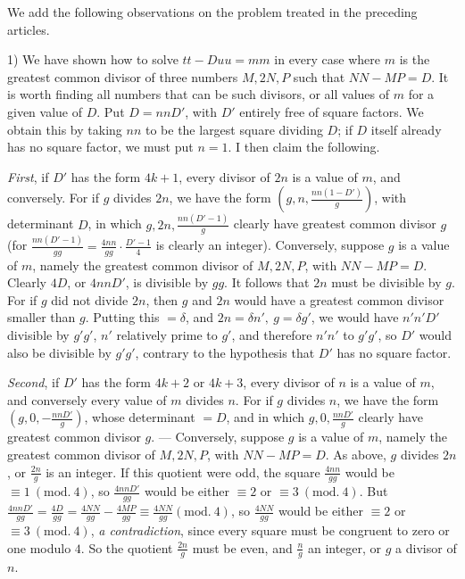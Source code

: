 We add the following observations on the problem treated in the preceding articles.

1) We have shown how to solve \(tt-Duu=mm\) in every case where \(m\) is the greatest common divisor of three numbers \(M,2N,P\) such that \(NN-MP=D\). It is worth finding all numbers that can be such divisors, or all values of \(m\) for a given value of \(D\). Put \(D=nnD'\), with \(D'\) entirely free of square factors. We obtain this by taking \(nn\) to be the largest square dividing \(D\); if \(D\) itself already has no square factor, we must put \(n=1\). I then claim the following.

\textit{First}, if \(D'\) has the form \(4k+1\), every divisor of \(2n\) is a value of \(m\), and conversely. For if \(g\) divides \(2n\), we have the form \(\left(g,n,\frac{nn(1-D')}{g}\right)\), with determinant \(D\), in which \(g,2n,\frac{nn(D'-1)}{g}\) clearly have greatest common divisor \(g\) (for \(\frac{nn(D'-1)}{gg}=\frac{4nn}{gg}\cdot\frac{D'-1}{4}\) is clearly an integer). Conversely, suppose \(g\) is a value of \(m\), namely the greatest common divisor of \(M,2N,P\), with \(NN-MP=D\). Clearly \(4D\), or \(4nnD'\), is divisible by \(gg\). It follows that \(2n\) must be divisible by \(g\). For if \(g\) did not divide \(2n\), then \(g\) and \(2n\) would have a greatest common divisor smaller than \(g\). Putting this \(=\delta\), and
\(2n=\delta n',\ g=\delta g'\), we would have \(n'n'D'\) divisible by \(g'g'\), \(n'\) relatively prime to \(g'\), and therefore \(n'n'\) to \(g'g'\), so \(D'\) would also be divisible by \(g'g'\), contrary to the hypothesis that \(D'\) has no square factor.

\textit{Second}, if \(D'\) has the form \(4k+2\) or \(4k+3\), every divisor of \(n\) is a value of \(m\), and conversely every value of \(m\) divides \(n\). For if \(g\) divides \(n\), we have the form \(\left(g,0,-\frac{nnD'}{g}\right)\), whose determinant \(=D\), and in which \(g,0,\frac{nnD'}{g}\) clearly have greatest common divisor \(g\). --- Conversely, suppose \(g\) is a value of \(m\), namely the greatest common divisor of \(M,2N,P\), with \(NN-MP=D\). As above, \(g\) divides \(2n\), or \(\frac{2n}{g}\) is an integer. If this quotient were odd, the square \(\frac{4nn}{gg}\) would be \(\equiv1\ (\mathrm{mod.}\ 4)\), so \(\frac{4nnD'}{gg}\) would be either \(\equiv2\) or \(\equiv3\ (\mathrm{mod.}\ 4)\). But \(\frac{4nnD'}{gg}=\frac{4D}{gg}=\frac{4NN}{gg}-\frac{4MP}{gg}\equiv\frac{4NN}{gg}(\mathrm{mod.}\ 4)\), so \(\frac{4NN}{gg}\) would be either \(\equiv2\) or \(\equiv3\ (\mathrm{mod.}\ 4)\), \textit{a contradiction}, since every square must be congruent to zero or one modulo \(4\). So the quotient \(\frac{2n}{g}\) must be even, and \(\frac{n}{g}\) an integer, or \(g\) a divisor of \(n\).

